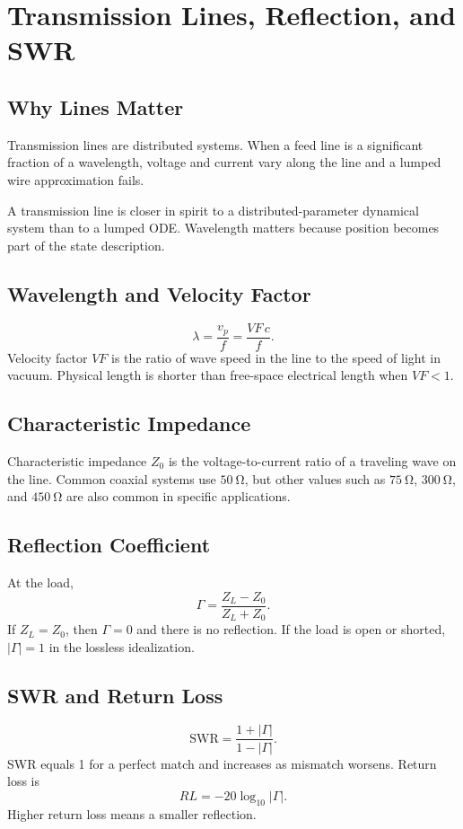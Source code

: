 \chapter{Transmission Lines, Reflection, and SWR}
\section{Why Lines Matter}
Transmission lines are distributed systems. When a feed line is a significant
fraction of a wavelength, voltage and current vary along the line and a lumped
wire approximation fails.

\begin{controlsbox}
A transmission line is closer in spirit to a distributed-parameter dynamical
system than to a lumped ODE. Wavelength matters because position becomes part of
the state description.
\end{controlsbox}

\section{Wavelength and Velocity Factor}
\[
\lambda=\frac{v_p}{f}=\frac{VF\,c}{f}.
\]
Velocity factor \(VF\) is the ratio of wave speed in the line to the speed of
light in vacuum. Physical length is shorter than free-space electrical length
when \(VF<1\).

\section{Characteristic Impedance}
Characteristic impedance \(Z_0\) is the voltage-to-current ratio of a traveling
wave on the line. Common coaxial systems use \(\SI{50}{\ohm}\), but other values
such as \(\SI{75}{\ohm}\), \(\SI{300}{\ohm}\), and \(\SI{450}{\ohm}\) are also
common in specific applications.

\section{Reflection Coefficient}
At the load,
\[
\Gamma=\frac{Z_L-Z_0}{Z_L+Z_0}.
\]
If \(Z_L=Z_0\), then \(\Gamma=0\) and there is no reflection. If the load is open
or shorted, \(|\Gamma|=1\) in the lossless idealization.

\section{SWR and Return Loss}
\[
\mathrm{SWR}=\frac{1+|\Gamma|}{1-|\Gamma|}.
\]
SWR equals 1 for a perfect match and increases as mismatch worsens. Return loss
is
\[
RL=-20\log_{10}|\Gamma|.
\]
Higher return loss means a smaller reflection.

